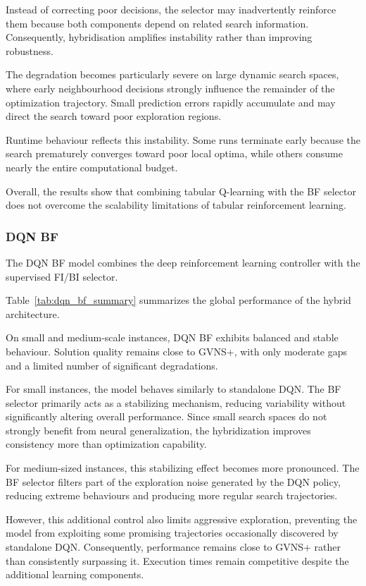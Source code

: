 Instead of correcting poor decisions, the selector may inadvertently reinforce them because both components depend on related search information. Consequently, hybridisation amplifies instability rather than improving robustness.

The degradation becomes particularly severe on large dynamic search spaces, where early neighbourhood decisions strongly influence the remainder of the optimization trajectory. Small prediction errors rapidly accumulate and may direct the search toward poor exploration regions.

Runtime behaviour reflects this instability. Some runs terminate early because the search prematurely converges toward poor local optima, while others consume nearly the entire computational budget.

Overall, the results show that combining tabular Q-learning with the BF selector does not overcome the scalability limitations of tabular reinforcement learning.

\subsubsection{DQN BF}
The DQN BF model combines the deep reinforcement learning controller with the supervised FI/BI selector.

Table~\ref{tab:dqn_bf_summary} summarizes the global performance of the hybrid architecture.


On small and medium-scale instances, DQN BF exhibits balanced and stable behaviour. Solution quality remains close to GVNS+, with only moderate gaps and a limited number of significant degradations.

For small instances, the model behaves similarly to standalone DQN. The BF selector primarily acts as a stabilizing mechanism, reducing variability without significantly altering overall performance. Since small search spaces do not strongly benefit from neural generalization, the hybridization improves consistency more than optimization capability.

For medium-sized instances, this stabilizing effect becomes more pronounced. The BF selector filters part of the exploration noise generated by the DQN policy, reducing extreme behaviours and producing more regular search trajectories.

However, this additional control also limits aggressive exploration, preventing the model from exploiting some promising trajectories occasionally discovered by standalone DQN. Consequently, performance remains close to GVNS+ rather than consistently surpassing it.
Execution times remain competitive despite the additional learning components.

